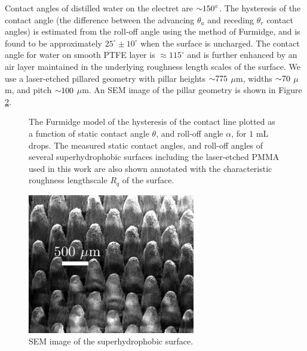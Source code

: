 \documentclass[12pt,a4paper,oneside]{book}
\begin{document}
Contact angles of distilled water on the electret are $\sim \hspace{-1mm} 150^{\circ}$. The hysteresis of the contact angle (the difference between the advancing $\theta_a$ and receding $\theta_r$ contact angles) is estimated from the roll-off angle using the method of Furmidge\cite{furmidge_studies_1962}, and is found to be approximately $25^{\circ} \pm 10^{\circ}$ when the surface is uncharged. The contact angle for water on smooth PTFE layer is $\approx 115^{\circ}$ and is further enhanced by an air layer maintained in the underlying roughness length scales of the surface. We use a laser-etched pillared geometry with pillar heights $\sim \hspace{-1mm} 775$ $\mu$m, widths $\sim \hspace{-1mm} 70$ $\mu$m, and pitch $\sim \hspace{-1mm} 100$ $\mu$m. An SEM image of the pillar geometry is shown in Figure \ref{fig:SEM}.
\begin{figure}
    \centering
    
       \caption{The Furmidge model of the hysteresis of the contact line plotted as a function of static contact angle $\theta$, and roll-off angle $\alpha$, for $1$ mL drops. The measured static contact angles, and roll-off angles of several superhydrophobic surfaces including the laser-etched PMMA used in this work are also shown annotated with the characteristic roughness lengthscale $R_q$ of the surface.\label{fig:hysteresis}}
\end{figure}

\begin{figure}
 \centering
 \includegraphics[width=0.65\textwidth]{../figures/SEM.pdf}
 \caption{SEM image of the superhydrophobic surface.\label{fig:SEM}}
\end{figure}
\end{document}
